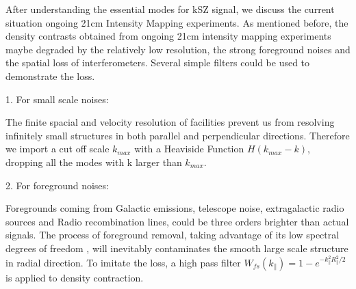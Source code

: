 After understanding the essential modes for kSZ signal, 
we discuss the current situation ongoing 21cm Intensity Mapping 
experiments. 
As mentioned before, the density contrasts obtained from  
ongoing 21cm intensity mapping experiments maybe degraded by 
the relatively low resolution, 
the strong foreground noises 
and the spatial loss of interferometers. 
Several simple filters could be used to demonstrate the loss.

1. For small scale noises:

The finite spacial and velocity resolution of facilities 
prevent us from resolving infinitely small structures in both parallel and perpendicular directions. 
Therefore we import a cut off scale $k_{max}$ with a Heaviside Function 
$H(k_{max}-k)$, dropping all the modes with k larger than $k_{max}$. 

2. For foreground noises:

Foregrounds coming from Galactic emissions, telescope noise, 
extragalactic radio sources and Radio recombination lines, 
could be three orders brighter than actual signals\cite{DiMatteo04,Masui13}. 
The process of foreground removal, taking advantage of its low spectral
degrees of freedom \cite{Switzer15}, 
will inevitably contaminates the smooth large scale structure in radial direction.  
To imitate the loss, a high pass filter $W_{fs}(k_\parallel)=1-e^{-k_\parallel^2R_\parallel^2/2}$ is applied to density contraction. 

